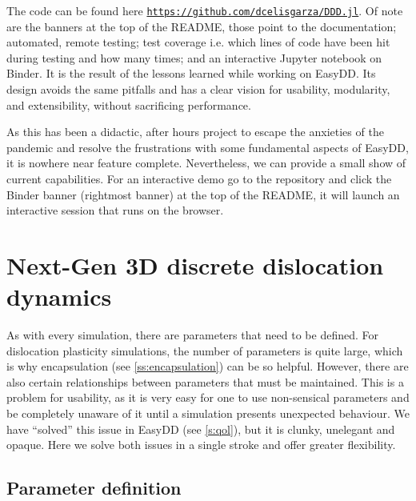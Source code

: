 The code can be found here \href{https://github.com/dcelisgarza/DDD.jl}{\texttt{https://github.com/dcelisgarza/DDD.jl}}. Of note are the banners at the top of the README, those point to the documentation; automated, remote testing; test coverage i.e. which lines of code have been hit during testing and how many times; and an interactive Jupyter notebook on Binder. It is the result of the lessons learned while working on EasyDD. Its design avoids the same pitfalls and has a clear vision for usability, modularity, and extensibility, without sacrificing performance.

As this has been a didactic, after hours project to escape the anxieties of the pandemic and resolve the frustrations with some fundamental aspects of EasyDD, it is nowhere near feature complete. Nevertheless, we can provide a small show of current capabilities. For an interactive demo go to the repository and click the Binder banner (rightmost banner) at the top of the README, it will launch an interactive session that runs on the browser.

\section{Next-Gen 3D discrete dislocation dynamics}

As with every simulation, there are parameters that need to be defined. For dislocation plasticity simulations, the number of parameters is quite large, which is why encapsulation (see \cref{ss:encapsulation}) can be so helpful. However, there are also certain relationships between parameters that must be maintained. This is a problem for usability, as it is very easy for one to use non-sensical parameters and be completely unaware of it until a simulation presents unexpected behaviour. We have ``solved'' this issue in EasyDD (see \cref{s:qol}), but it is clunky, unelegant and opaque. Here we solve both issues in a single stroke and offer greater flexibility.

\subsection{Parameter definition}

